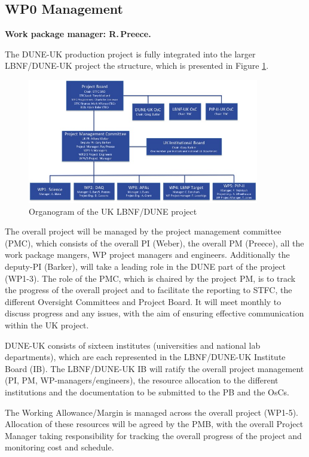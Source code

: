 \subsection{WP0 Management}

{\bf Work package manager: R.\,Preece.}

The DUNE-UK production project is fully integrated into the larger LBNF/DUNE-UK project the structure, which is presented in Figure \ref{fig:organogram}. 
\begin{figure}[htb]
    \centering
    \includegraphics[width=0.9\textwidth]{figs/organogram.jpg}
    \caption{Organogram of the UK LBNF/DUNE project}
    \label{fig:organogram}
\end{figure}

The overall project will be managed by the project management committee (PMC), which consists of the overall PI (Weber), the overall PM (Preece), all the work package mangers, WP project managers and engineers. Additionally the deputy-PI (Barker), will take a leading role in the DUNE part of the project (WP1-3). The role of the PMC, which is chaired by the project PM, is to track the progress of the overall project and to facilitate the reporting to STFC, the different Oversight Committees and Project Board.
It will meet monthly to discuss progress and any issues, with the aim of ensuring 
effective communication within the UK project. 

DUNE-UK consists of sixteen institutes (universities and national lab departments), which are each represented in the  LBNF/DUNE-UK Institute Board (IB). The LBNF/DUNE-UK IB will ratify the overall project management (PI, PM, WP-managers/engineers), the resource allocation to the different institutions and the documentation to be submitted to the PB and the OsCs.

The Working Allowance/Margin is managed across the overall project (WP1-5). Allocation of these resources will be agreed by the PMB, with the overall Project Manager taking responsibility for tracking the overall progress of the project and monitoring cost and schedule. 

